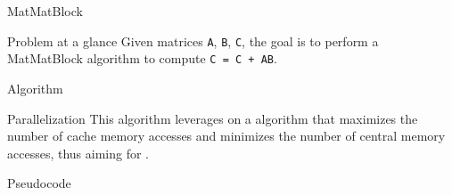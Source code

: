 \usepackage{glossaries-extra}\begin{chapter}{MatMatBlock}
    \begin{section}{Problem at a glance}
        Given matrices \texttt{A}, \texttt{B}, \texttt{C}, the goal is to perform a MatMatBlock algorithm to compute \texttt{C = C + AB}.
    \end{section}
    \begin{section}{Algorithm}
        \begin{subsection}{Parallelization}
            This algorithm leverages on a  algorithm that maximizes the number of cache memory accesses and minimizes the number of central memory accesses, thus aiming for .
        \end{subsection}
        \begin{subsection}{Pseudocode}

        \end{subsection}
    \end{section}
\end{chapter}